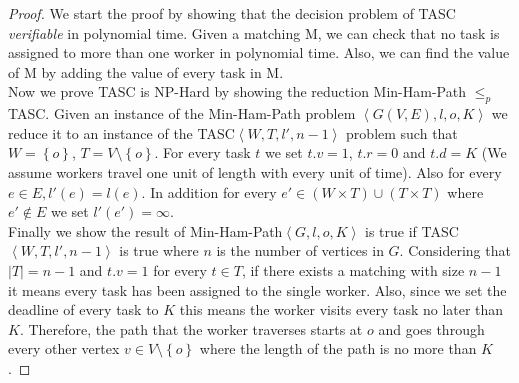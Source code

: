 \begin{proof}
We start the proof by showing that the decision problem of TASC \textit{verifiable} in polynomial time. Given a matching M, we can check that no task is assigned to more than one worker in polynomial time. Also, we can find the value of M by adding the value of every task in M.\\

Now we prove TASC is NP-Hard by showing the reduction Min-Ham-Path $\leq_p$ TASC. Given an instance of the Min-Ham-Path problem $\left\langle G(V,E), l, o, K \right\rangle$ we reduce it to an instance of the TASC$\left\langle W, T, l', n-1 \right\rangle$ problem such that $W = \left\{ o \right\}$, $T = V \setminus \left\{ o \right\}$. For every task $t$ we set $t.v = 1$, $t.r = 0$ and $t.d = K$ (We assume workers travel one unit of length with every unit of time). Also for every $e \in E, l'(e) = l(e)$. In addition for every $e' \in \left( W \times T \right) \cup \left( T \times T \right) $ where $e' \not\in E$ we set $l'(e') = \infty$.\\ 

Finally we show the result of Min-Ham-Path$\left\langle G, l, o, K \right\rangle$ is true if TASC$\left\langle W, T, l', n-1 \right\rangle$ is true where $n$ is the number of vertices in $G$. Considering that $\left\vert T \right\vert = n - 1$ and $t.v = 1$ for every $t \in T$, if there exists a matching with size $n - 1$ it means every task has been assigned to the single worker. Also, since we set the deadline of every task to $K$ this means the worker visits every task no later than $K$. Therefore, the path that the worker traverses starts at $o$ and goes through every other vertex $v \in V \setminus \left\{ o \right\}$ where the length of the path is no more than $K$.
\end{proof}